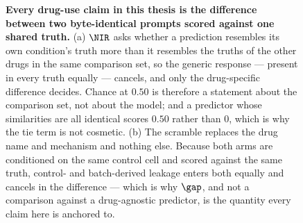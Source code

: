 \begin{figure}[htbp]
\begin{tikzpicture}
\end{tikzpicture}
\caption[How NIR and the scramble ablation work]{\textbf{Every drug-use claim in this thesis is the
difference between two byte-identical prompts scored against one shared truth.} (a) $\NIR$ asks
whether a prediction resembles its own condition's truth more than it resembles the truths of the
other drugs in the same comparison set, so the generic response --- present in every truth equally
--- cancels, and only the drug-specific difference decides. Chance at $0.50$ is therefore a statement
about the comparison set, not about the model; and a predictor whose similarities are all identical
scores $0.50$ rather than $0$, which is why the tie term is not cosmetic. (b) The scramble replaces
the drug name and mechanism and nothing else. Because both arms are conditioned on the same control
cell and scored against the same truth, control- and batch-derived leakage enters both equally and
cancels in the difference --- which is why $\gap$, and not a comparison against a drug-agnostic
predictor, is the quantity every claim here is anchored to.}
\label{fig:instrument}
\end{figure}
